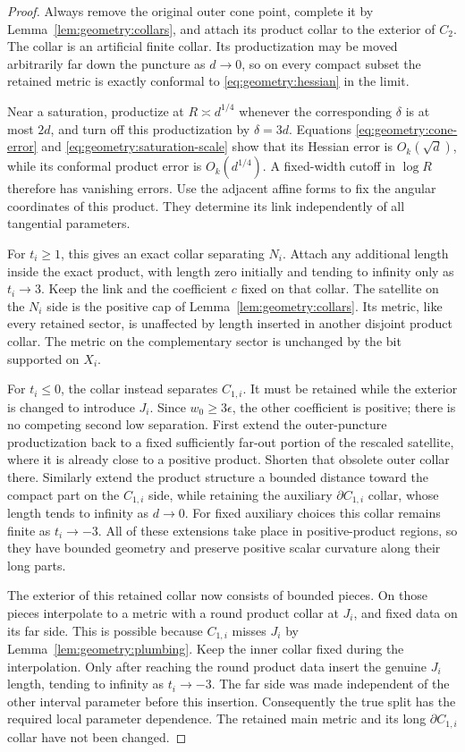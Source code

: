 \begin{proof}
Always remove the original outer cone point, complete it by
Lemma~\ref{lem:geometry:collars}, and attach its product collar
to the exterior of $C_2$.  The collar is an artificial finite
collar.  Its productization may be moved arbitrarily far down
the puncture as $d\to0$, so on every compact subset the
retained metric is exactly conformal to
\eqref{eq:geometry:hessian} in the limit.

Near a saturation, productize at $R\asymp d^{1/4}$ whenever
the corresponding $\delta$ is at most $2d$, and turn off this
productization by $\delta=3d$.  Equations
\eqref{eq:geometry:cone-error} and
\eqref{eq:geometry:saturation-scale} show that its Hessian error
is $O_k(\sqrt d)$, while its conformal product error is
$O_k(d^{1/4})$.  A fixed-width cutoff in $\log R$ therefore
has vanishing errors.  Use the adjacent affine forms to fix
the angular coordinates of this product.  They determine its
link independently of all tangential parameters.

For $t_i\ge1$, this gives an exact collar separating $N_i$.
Attach any additional length inside the exact product, with
length zero initially and tending to infinity only as
$t_i\to3$.  Keep the link and the coefficient $c$ fixed on
that collar.  The satellite on the $N_i$ side is the positive
cap of Lemma~\ref{lem:geometry:collars}.  Its metric, like
every retained sector, is unaffected by length inserted
in another disjoint product collar.  The metric on the
complementary sector is unchanged by the bit supported
on $X_i$.

For $t_i\le0$, the collar instead separates $C_{1,i}$.  It
must be retained while the exterior is changed to introduce
$J_i$.  Since $w_0\ge3\epsilon$, the other coefficient is
positive; there is no competing second low separation.
First extend the outer-puncture productization back to a
fixed sufficiently far-out portion of the rescaled satellite,
where it is already close to a positive product.  Shorten
that obsolete outer collar there.  Similarly extend the
product structure a bounded distance toward the compact
part on the $C_{1,i}$ side, while retaining the auxiliary
$\partial C_{1,i}$ collar, whose length tends to infinity as
$d\to0$.  For fixed auxiliary choices this collar remains finite
as $t_i\to-3$.  All of these extensions
take place in positive-product regions, so they have bounded
geometry and preserve positive scalar curvature along their
long parts.

The exterior of this retained collar now consists of bounded
pieces.  On those pieces interpolate to a metric with a
round product collar at $J_i$, and fixed data on its far
side.  This is possible because $C_{1,i}$ misses $J_i$ by
Lemma~\ref{lem:geometry:plumbing}.  Keep the inner collar
fixed during the interpolation.  Only after reaching the
round product data insert the genuine $J_i$ length, tending
to infinity as $t_i\to-3$.  The far side was made independent
of the other interval parameter before this insertion.
Consequently the true split has the required local parameter
dependence.  The retained main metric and its long
$\partial C_{1,i}$ collar have not been changed.


\end{proof}
